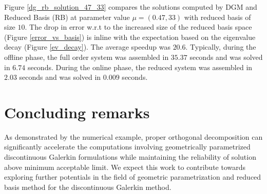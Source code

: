 \documentclass[graybox]{svmult}
\begin{document}
Figure \ref{dg_rb_solution_47_33} compares the solutions computed by DGM and Reduced Basis (RB) at parameter value $\mu = (0.47,33)$ with reduced basis of size $10$. The drop in error w.r.t to the increased size of the reduced basis space (Figure \ref{error_vs_basis}) is inline with the expectation based on the eigenvalue decay (Figure \ref{ev_decay}). The average speedup was $20.6$. Typically, during the offline phase, the full order system was assembled in $35.37$ seconds and was solved in $6.74$ seconds. During the online phase, the reduced system was assembled in $2.03$ seconds and was solved in $0.009$ seconds.

\section{Concluding remarks}

As demonstrated by the numerical example, proper orthogonal decomposition can significantly accelerate the computations involving geometrically parametrized discontinuous Galerkin formulations while maintaining the reliability of solution above minimum acceptable limit. We expect this work to contribute towards exploring further potentials in the field of geometric parametrization and reduced basis method for the discontinuous Galerkin method.
\end{document}
